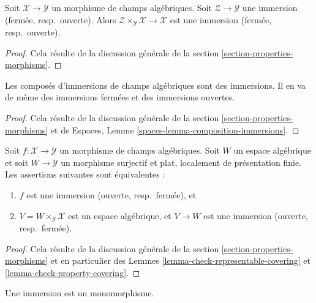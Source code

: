 \begin{lemma}
\label{lemma-base-change-immersion}
Soit $\mathcal{X} \to \mathcal{Y}$ un morphisme de champs algébriques.
Soit $\mathcal{Z} \to \mathcal{Y}$ une immersion
(fermée, resp.\ ouverte).
Alors $\mathcal{Z} \times_\mathcal{Y} \mathcal{X} \to \mathcal{X}$
est une immersion (fermée, resp.\ ouverte).
\end{lemma}

\begin{proof}
Cela résulte de la discussion générale de la
section \ref{section-properties-morphisms}.
\end{proof}

\begin{lemma}
\label{lemma-composition-immersion}
Les composés d'immersions de champs algébriques sont des immersions.
Il en va de même des immersions fermées et des immersions ouvertes.
\end{lemma}

\begin{proof}
Cela résulte de la discussion générale de la
section \ref{section-properties-morphisms}
et de
Espaces, Lemme \ref{spaces-lemma-composition-immersions}.
\end{proof}

\begin{lemma}
\label{lemma-check-immersion-covering}
Soit $f : \mathcal{X} \to \mathcal{Y}$ un morphisme de champs algébriques.
Soit $W$ un espace algébrique et soit $W \to \mathcal{Y}$ un morphisme surjectif
et plat, localement de présentation finie. Les assertions suivantes
sont équivalentes :
\begin{enumerate}
\item $f$ est une immersion (ouverte, resp.\ fermée), et
\item $V = W \times_\mathcal{Y} \mathcal{X}$ est un espace algébrique, et
$V \to W$ est une immersion (ouverte, resp.\ fermée).
\end{enumerate}
\end{lemma}

\begin{proof}
Cela résulte de la discussion générale de la
section \ref{section-properties-morphisms}
et en particulier des
Lemmes \ref{lemma-check-representable-covering} et
\ref{lemma-check-property-covering}.
\end{proof}

\begin{lemma}
\label{lemma-immersion-monomorphism}
Une immersion est un monomorphisme.
\end{lemma}

